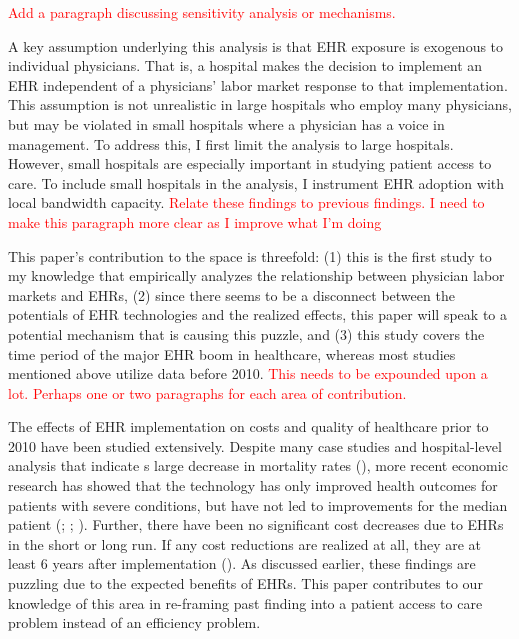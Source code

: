 \documentclass[11pt]{article}
\begin{document}
\textcolor{red}{Add a paragraph discussing sensitivity analysis or mechanisms.}

A key assumption underlying this analysis is that EHR exposure is exogenous to individual physicians. That is, a hospital makes the decision to implement an EHR independent of a physicians' labor market response to that implementation. This assumption is not unrealistic in large hospitals who employ many physicians, but may be violated in small hospitals where a physician has a voice in management. To address this, I first limit the analysis to large hospitals. However, small hospitals are especially important in studying patient access to care. To include small hospitals in the analysis, I instrument EHR adoption with local bandwidth capacity. \textcolor{red}{Relate these findings to previous findings. I need to make this paragraph more clear as I improve what I'm doing}

This paper's contribution to the space is threefold: (1) this is the first study to my knowledge that empirically analyzes the relationship between physician labor markets and EHRs, (2) since there seems to be a disconnect between the potentials of EHR technologies and the realized effects, this paper will speak to a potential mechanism that is causing this puzzle, and (3) this study covers the time period of the major EHR boom in healthcare, whereas most studies mentioned above utilize data before 2010. \textcolor{red}{This needs to be expounded upon a lot. Perhaps one or two paragraphs for each area of contribution.}

The effects of EHR implementation on costs and quality of healthcare prior to 2010 have been studied extensively. Despite many case studies and hospital-level analysis that indicate s large decrease in mortality rates (\cite{Buntin2011TheResults}), more recent economic research has showed that the technology has only improved health outcomes for patients with severe conditions, but have not led to improvements for the median patient (\cite{Agha2014TheCare}; \cite{McCullough2016HealthCoordination}; \cite{Meyerhoefer}). Further, there have been no significant cost decreases due to EHRs in the short or long run. If any cost reductions are realized at all, they are at least 6 years after implementation (\cite{dranove2014trillion}). As discussed earlier, these findings are puzzling due to the expected benefits of EHRs. This paper contributes to our knowledge of this area in re-framing past finding into a patient access to care problem instead of an efficiency problem.
\end{document}
